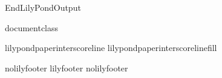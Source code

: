 %
\def\ifundefined#1{\expandafter\ifx\csname#1\endcsname\relax}
%
\ifx\mustmakelilypondtitle\undefined\else\makelilypondtitle\fi
\ifx\mustmakelilypondpiecetitle\undefined\else\makelilypondpiecetitle\fi
%
\def\SkipLilydefs{\endinput}
\ifundefined{EndLilyPondOutput}
        \def\EndLilyPondOutput{\csname bye\endcsname}
        \def\SkipLilydefs{}
\fi
\SkipLilydefs

\ifundefined{documentclass}
        
\else
        
\fi


%
\def\botalign#1{\vbox to 0pt{\vss #1}}
\def\leftalign#1{\hbox to 0pt{#1\hss}}



\def\myfilbreak{\par\vfil\penalty200\vfilneg}

\ifundefined{lilypondpaperinterscoreline}
        \def\lilypondpaperinterscoreline{16}
\fi
\ifundefined{lilypondpaperinterscorelinefill}
        \def\lilypondpaperinterscorelinefill{0}
\fi

\def\interscoreline{\vskip\lilypondpaperinterscoreline pt plus %
  \lilypondpaperinterscorelinefill fill\myfilbreak}

\def\placebox#1#2#3{%
        \botalign{\hbox{\raise #1\leftalign{\kern #2{}#3}}}}%

\ifx\pdfoutput\undefined  
  
\else
  
\fi

\def\EndLilyPondOutput{%
 \vskip 0pt plus \lilypondpaperinterscorelinefill00 fill\csname bye\endcsname
}
\def\postheader{}


\ifx\csname nolilyfooter\endcsname\relax
        \csname lilyfooter\texsuffix\endcsname%
\else
        \csname%
        nolilyfooter\texsuffix\endcsname
\fi

\endinput
